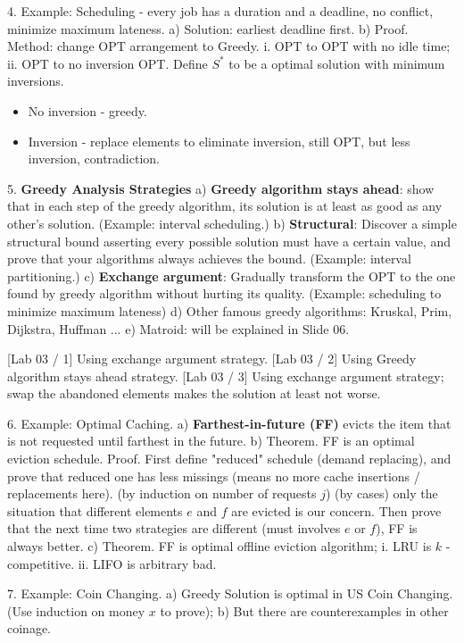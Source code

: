 \documentclass[10pt,a4paper]{article}
\begin{document}
4. Example: Scheduling - every job has a duration and a deadline, no conflict, minimize maximum lateness.
a) Solution: earliest deadline first.
b) Proof. Method: change OPT arrangement to Greedy.
    i. OPT to OPT with no idle time;
    ii. OPT to no inversion OPT.
    Define \(S^{*}\) to be a optimal solution with minimum inversions.
    \begin{itemize}
        \item No inversion - greedy.
        \item Inversion - replace elements to eliminate inversion, still OPT, but less inversion, contradiction.
    \end{itemize}

5. \textbf{Greedy Analysis Strategies}
a) \textbf{Greedy algorithm stays ahead}: show that in each step of the greedy algorithm, its solution is at least as good as any other's solution. (Example: interval scheduling.)
b) \textbf{Structural}: Discover a simple structural bound asserting every possible solution must have a certain value, and prove that your algorithms always achieves the bound. (Example: interval partitioning.)
c) \textbf{Exchange argument}: Gradually transform the OPT to the one found by greedy algorithm without hurting its quality. (Example: scheduling to minimize maximum lateness)
d) Other famous greedy algorithms: Kruskal, Prim, Dijkstra, Huffman ...
e) Matroid: will be explained in Slide 06.

[Lab 03 / 1] Using exchange argument strategy.
[Lab 03 / 2] Using Greedy algorithm stays ahead strategy.
[Lab 03 / 3] Using exchange argument strategy; swap the abandoned elements makes the solution at least not worse.

6. Example: Optimal Caching.
a) \textbf{Farthest-in-future (FF)} evicts the item that is not requested until farthest in the future.
b) Theorem. FF is an optimal eviction schedule.
Proof. First define "reduced" schedule (demand replacing), and prove that reduced one has less missings (means no more cache insertions / replacements here). (by induction on number of requests \(j\)) (by cases) only the situation that different elements \(e\) and \(f\) are evicted is our concern. Then prove that the next time two strategies are different (must involves \(e\) or \(f\)), FF is always better.
c) Theorem. FF is optimal offline eviction algorithm;
    i. LRU is \(k\) -competitive.
    ii. LIFO is arbitrary bad.

7. Example: Coin Changing.
a) Greedy Solution is optimal in US Coin Changing. (Use induction on money \(x\) to prove);
b) But there are counterexamples in other coinage.
\end{document}
